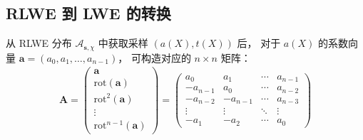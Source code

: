 \documentclass[12pt,a4paper]{article}
\numberwithin{equation}{section}
\begin{document}



\subsection{RLWE 到 LWE 的转换}
从 RLWE 分布 $\mathcal{A}_{\mathbf{s},\chi}$ 中获取采样 $(a(X), t(X))$ 后，
对于 $a(X)$ 的系数向量 $\mathbf{a} = (a_0, a_1, \ldots , a_{n-1})$，
可构造对应的 $n \times n$ 矩阵：
\begin{align}
    \mathbf{A} = \begin{pmatrix}
        \mathbf{a} \\
        \mathrm{rot}(\mathbf{a}) \\
        \mathrm{rot}^2(\mathbf{a}) \\
        \vdots \\
        \mathrm{rot}^{n-1}(\mathbf{a})
    \end{pmatrix} 
    = 
    \begin{pmatrix}
        a_0 & a_1 & \cdots & a_{n-1} \\ 
        -a_{n-1} & a_0 & \cdots & a_{n-2} \\ 
        -a_{n-2} & -a_{n-1} & \cdots & a_{n-3} \\ 
        \vdots & \vdots & \ddots & \vdots \\ 
        -a_1 & -a_2 & \cdots & a_0
    \end{pmatrix}
\end{align}
\end{document}

